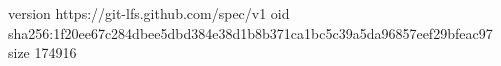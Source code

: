 version https://git-lfs.github.com/spec/v1
oid sha256:1f20ee67c284dbee5dbd384e38d1b8b371ca1bc5c39a5da96857eef29bfeac97
size 174916
